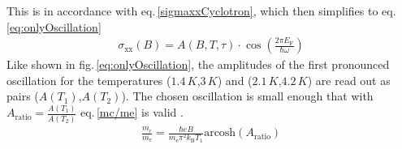 This is in accordance with eq.\,\ref{sigmaxxCyclotron}, which then simplifies to eq.\,\ref{eq:onlyOscillation}
\begin{align}
    \sigma_\text{xx}(B) = A(B,T,\tau)\cdot\cos{\left(\frac{2\pi E_\text{F}}{\hbar\omega}\right)}
    \label{eq:onlyOscillation}
\end{align}
Like shown in fig.\,\ref{eq:onlyOscillation}, the amplitudes of the first pronounced oscillation for
the temperatures ($1.4\,K$,$3\,K$) and ($2.1\,K$,$4.2\,K$) are read out as pairs ($A(T_1)$,$A(T_2)$).
The chosen oscillation is small enough that with $A_\text{ratio}=\frac{A(T_1)}{A(T_2)}$ eq.\,\ref{mc/me} is valid \cite{Tasksheet}.
\begin{align}
    \frac{m_\text{c}}{m_\text{e}}=\frac{\hbar eB}{m_\text{e}\pi^2k_\text{B}T_1}\text{arcosh}\left(A_\text{ratio}\right)
\end{align}